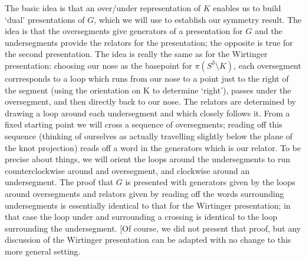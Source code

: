The basic idea is that an over/under representation of $K$ enables us to 
build  `dual' presentations of $G$, which we will use to establish 
our symmetry result. The idea is that the oversegments give generators of
a presentation for $G$
and the undersegments provide the relators for the presentation; the opposite
is true for the second presentation. The idea is really the same as
for the Wirtinger presentation: choosing our nose as the basepoint for
$\pi(S^3\setminus K)$, each oversegment corrresponds to a loop which runs from 
our nose to a point just to the right of the segment (using the orientation
on K to determine `right'), passes under the oversegment, and then directly
back to our nose. The relators are determined by drawing a loop around each 
undersegment and which closely follows it. From a fixed starting point we will cross
a sequence of oversegments; reading off this sequence (thinking of ourselves
as actually travelling slightly below the plane of the knot projection)
reads off a word in the generators which is our relator. To be precise about 
things, we will orient the loops around the undersegments to run counterclockwise
around and oversegment, and clockwise around an undersegment. The proof that
$G$ is presented with generators given by the loops around oversegments and
relators given by reading off the words surrounding undersegments is essentially
identical to that for the Wirtinger presentation; in that case the loop under
and surrounding a crossing is identical to the loop surrounding the undersegment.
[Of course, we did not present that proof, but any discussion of the Wirtinger
presentation can be adapted with no change to this more general setting.

\ssk

